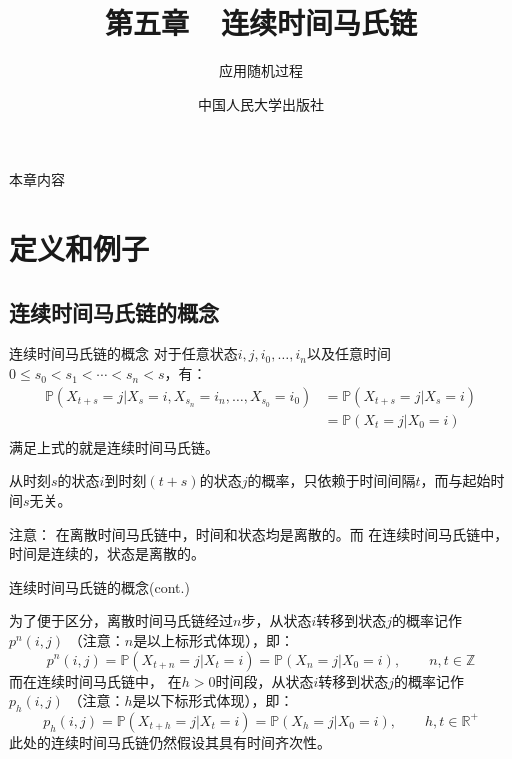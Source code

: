 \documentclass[t]{beamer}
\renewcommand{\Pr}{\mathbb{P}}
\begin{document}
\fontsize{11}{18}\selectfont


\CTEXindent



  \title{第五章~~连续时间马氏链}
\author{应用随机过程}
\date{中国人民大学出版社}
  \begin{frame}
    \maketitle
  \end{frame}

\begin{frame}{本章内容}
  \begin{multicols}{2}
    \tableofcontents
  \end{multicols}
\end{frame}

\section{定义和例子}

\subsection{连续时间马氏链的概念}
\begin{frame}{连续时间马氏链的概念}
  对于任意状态$i,j,i_0,\ldots,i_{n}$以及任意时间$0\le s_0<s_1<\cdots<s_n<s$，有：
  \[\begin{split}
  \Pr(X_{t+s}=j|X_s=i,X_{s_n}=i_{n},\ldots,X_{s_0}=i_0)&=\Pr(X_{t+s}=j|X_s=i) \\
  &=\Pr(X_{t}=j|X_0=i) \\
  \end{split}\]
  满足上式的就是连续时间马氏链。
  
  从时刻$s$的状态$i$到时刻$(t+s)$的状态$j$的概率，只依赖于时间间隔$t$，而与起始时间$s$无关。

  \begin{block}{注意：}
    在离散时间马氏链中，时间和状态均是离散的。而
  在连续时间马氏链中，{时间是连续的}，{状态是离散的}。
  \end{block}
\end{frame}


\begin{frame}{连续时间马氏链的概念(cont.)}

  为了便于区分，离散时间马氏链经过$n$步，从状态$i$转移到状态$j$的概率记作$p^n(i,j)$ （注意：$n$是以上标形式体现），即：
  \[p^n(i,j)=\Pr(X_{t+{n}}=j|X_t=i)=\Pr(X_{n}=j|X_0=i), \qquad n,t \in\mathbb{Z} \]
  而在连续时间马氏链中，
  在$h>0$时间段，从状态$i$转移到状态$j$的概率记作$p_{h}(i,j)$ （注意：$h$是以下标形式体现），即：
  \[p_{h}(i,j)=\Pr(X_{t+{h}}=j|X_t=i)=\Pr(X_{h}=j|X_0=i), \qquad h,t\in\mathbb{R}^+ \]
  此处的连续时间马氏链仍然假设其具有时间齐次性。
\end{frame}
\end{document}
